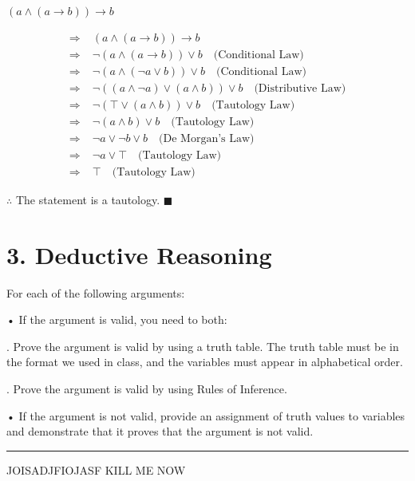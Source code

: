 \documentclass[]{article}
\begin{document}
\begin{question}
    $(a \land (a \rightarrow b)) \rightarrow b$
\end{question}
\begin{align*}
    \Rightarrow\; & (a \land (a \rightarrow b)) \rightarrow b \\
    \Rightarrow\; & \neg(a \land (a \rightarrow b)) \lor b \quad \text{(Conditional Law)} \\
    \Rightarrow\; & \neg(a \land (\neg a \lor b)) \lor b \quad \text{(Conditional Law)} \\
    \Rightarrow\; & \neg((a \land \neg a) \lor (a \land b)) \lor b \quad \text{(Distributive Law)} \\
    \Rightarrow\; & \neg(\top \lor (a\land b)) \lor b \quad \text{(Tautology Law)}\\
    \Rightarrow\; &  \neg(a \land b) \lor b \quad \text{(Tautology Law)} \\
    \Rightarrow\; & \neg a \lor \neg b \lor b \quad \text{(De Morgan's Law)} \\
    \Rightarrow\; & \neg a \lor \top \quad \text{(Tautology Law)} \\
    \Rightarrow\; & \top \quad \text{(Tautology Law)}
\end{align*}
\begin{center}
    $\therefore$ The statement is a tautology. $\blacksquare$
\end{center}
\section*{3. Deductive Reasoning}
For each of the following arguments:

\quad • If the argument is valid, you need to both:

\quad {}. Prove the argument is valid by using a truth table. The truth table must be in the format we used in class, and the variables must appear in alphabetical order.

\quad {}. Prove the argument is valid by using Rules of Inference.

\quad • If the argument is not valid, provide an assignment of truth values to variables and demonstrate that it proves
that the argument is not valid.
\vspace{0.1in}
\hrule
\vspace{0.1in}

JOISADJFIOJASF KILL ME NOW
\end{document}
